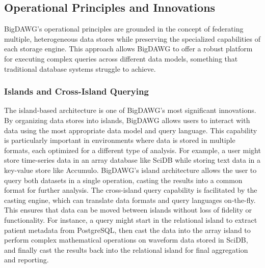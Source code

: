 \subsection{Operational Principles and Innovations}
\ac{BigDAWG}'s operational principles are grounded in the concept of federating multiple, heterogeneous data stores while preserving the specialized capabilities of each storage engine. This approach allows \ac{BigDAWG} to offer a robust platform for executing complex queries across different data models, something that traditional database systems struggle to achieve.
\subsubsection{Islands and Cross-Island Querying}
The island-based architecture is one of \ac{BigDAWG}'s most significant innovations. By organizing data stores into islands, \ac{BigDAWG} allows users to interact with data using the most appropriate data model and query language. This capability is particularly important in environments where data is stored in multiple formats, each optimized for a different type of analysis. For example, a user might store time-series data in an array database like SciDB while storing text data in a key-value store like Accumulo. \ac{BigDAWG}'s island architecture allows the user to query both datasets in a single operation, casting the results into a common format for further analysis.
The cross-island query capability is facilitated by the casting engine, which can translate data formats and query languages on-the-fly. This ensures that data can be moved between islands without loss of fidelity or functionality. For instance, a query might start in the relational island to extract patient metadata from PostgreSQL, then cast the data into the array island to perform complex mathematical operations on waveform data stored in SciDB, and finally cast the results back into the relational island for final aggregation and reporting.

